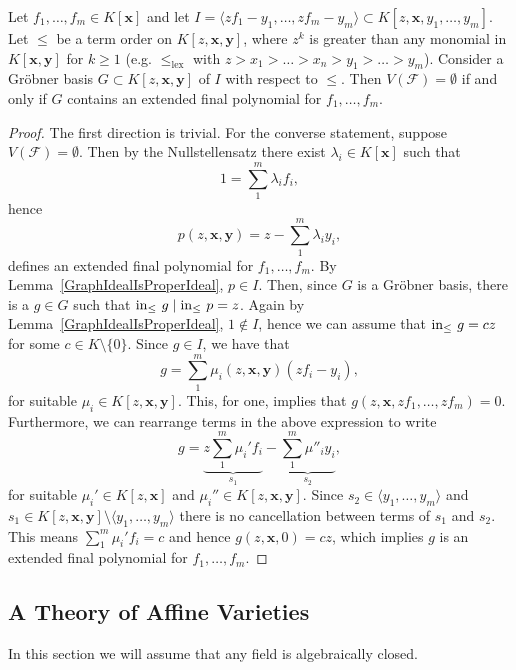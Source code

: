 \begin{theorem}\label{ExtendedFinPolTheorem}
    Let $f_1,\dots,f_m\in K[\mathbf{x}]$ and let $I= \langle zf_1-y_1,\dots,zf_m -y_m\rangle \subset K[z,\mathbf{x},y_1,\dots,y_m]$. Let $\leq$ be a term order on $K[z,\mathbf{x},\mathbf{y}]$, where $z^k$ is greater than any monomial in $K[\mathbf{x}, \mathbf{y}]$ for $k\geq 1$ (e.g. $\leq_\text{lex}$ with $z>x_1>\dots>x_n>y_1>\dots>y_m$). Consider a Gröbner basis $G\subset K[z,\mathbf{x},\mathbf{y}]$ of $I$ with respect to $\leq$. Then $V(\mathcal{F}) = \emptyset$ if and only if $G$ contains an extended final polynomial for $f_1,\dots,f_m$.
\end{theorem}
\begin{proof}
    The first direction is trivial. For the converse statement, suppose $V(\mathcal{F}) = \emptyset$. Then by the Nullstellensatz there exist $\lambda_i\in K[\mathbf{x}]$ such that 
    $$1 = \sum_1^m \lambda_i f_i,$$
    hence
    $$p(z,\mathbf{x},\mathbf{y}) = z - \sum_1^m \lambda_i y_i,$$
    defines an extended final polynomial for $f_1,\dots,f_m$. By Lemma~\ref{GraphIdealIsProperIdeal}, $p\in I$. Then, since $G$ is a Gröbner basis, there is a $g\in G$ such that 
    $\mathrm{in}_\leq\ g \mid \mathrm{in}_\leq\ p = z$. Again by Lemma~\ref{GraphIdealIsProperIdeal}, $1\notin I$, hence we can assume that $\mathrm{in}_\leq \ g = cz$ for some $c\in K\setminus\{0\}$. Since $g\in I$, we have that 
    \begin{equation*}
        g = \sum_1^m \mu_i(z,\mathbf{x},\mathbf{y}) (zf_i -y_i),
    \end{equation*}
    for suitable $\mu_i \in K[z,\mathbf{x},\mathbf{y}]$. This, for one, implies that $g(z,\mathbf{x},zf_1,\dots,zf_m)=0$. Furthermore, we can rearrange terms in the above expression to write 
    $$g = \underbrace{z\sum_1^m \mu_i'f_i}_{s_1} - \underbrace{\sum_1^m \mu''_iy_i}_{s_2},$$
    for suitable $\mu_i'\in K[z,\mathbf{x}]$ and $\mu_i''\in K[z,\mathbf{x},\mathbf{y}]$.
    Since $s_2\in \langle y_1,\dots,y_m\rangle$ and\\ $s_1\in K[z,\mathbf{x},\mathbf{y}]\setminus \langle y_1,\dots,y_m\rangle$ there is no cancellation between terms of $s_1$ and $s_2$. This means $\sum_1^m\mu_i'f_i=c$ and hence $g(z,\mathbf{x},0)=cz$, which implies $g$ is an extended final polynomial for $f_1,\dots,f_m$.
\end{proof}
\subsection{A Theory of Affine Varieties}
In this section we will assume that any field is algebraically closed.
